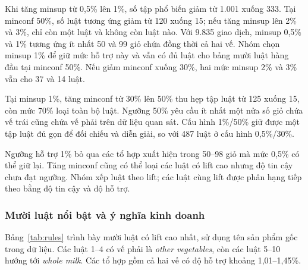 Khi tăng minsup từ 0,5\% lên 1\%, số tập
phổ biến giảm từ 1.001 xuống 333. Tại minconf 50\%, số luật tương ứng
giảm từ 120 xuống 15; nếu tăng minsup lên 2\% và 3\%, chỉ còn một luật
và không còn luật nào. Với 9.835 giao dịch, minsup 0,5\% và 1\%
tương ứng ít nhất 50 và 99 giỏ chứa đồng thời cả hai vế.
Nhóm chọn minsup 1\% để giữ mức hỗ trợ này và vẫn có đủ luật cho
bảng mười luật hàng đầu tại minconf 50\%. Nếu giảm minconf xuống 30\%, hai mức minsup 2\%
và 3\% vẫn cho 37 và 14 luật.

Tại minsup 1\%, tăng minconf từ 30\% lên 50\% thu hẹp tập luật
từ 125 xuống 15, còn mức 70\% loại toàn bộ luật. Ngưỡng 50\% yêu cầu
ít nhất một nửa số giỏ chứa vế trái cũng chứa vế phải trên dữ liệu
quan sát. Cấu hình 1\%/50\% giữ được một tập luật đủ gọn để đối chiếu
và diễn giải, so với 487 luật ở cấu hình 0,5\%/30\%.

Ngưỡng hỗ trợ 1\% bỏ qua các tổ hợp xuất hiện trong 50--98 giỏ
mà mức 0,5\% có thể giữ lại. Tăng minconf cũng có thể loại các luật
có lift cao nhưng độ tin cậy chưa đạt ngưỡng.
Nhóm xếp luật theo lift; các luật cùng lift
được phân hạng tiếp theo bằng độ tin cậy và độ hỗ trợ.

\subsubsection{Mười luật nổi bật và ý nghĩa kinh doanh}
Bảng~\ref{tab:rules} trình bày mười luật có lift cao nhất, sử dụng tên
sản phẩm gốc trong dữ liệu. Các luật 1--4 có vế phải là
\textit{other vegetables}, còn các luật 5--10 hướng tới
\textit{whole milk}. Các tổ hợp gồm cả hai vế có độ hỗ trợ
khoảng 1,01--1,45\%.

